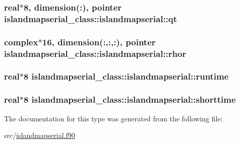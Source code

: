 \hypertarget{structislandmapserial__class_1_1islandmapserial_af02aedef0d1691e6628a5530c4417a9b}{
\subsubsection[{qt}]{\setlength{\rightskip}{0pt plus 5cm}real$\ast$8, dimension(\+:), pointer islandmapserial\+\_\+class\+::islandmapserial\+::qt\hspace{0.3cm}{\ttfamily [private]}}}\label{structislandmapserial__class_1_1islandmapserial_af02aedef0d1691e6628a5530c4417a9b}
\hypertarget{structislandmapserial__class_1_1islandmapserial_ad1b1997b9bd1ab97f872981ef86b4a8d}{
\subsubsection[{rhor}]{\setlength{\rightskip}{0pt plus 5cm}complex$\ast$16, dimension(\+:,\+:,\+:), pointer islandmapserial\+\_\+class\+::islandmapserial\+::rhor\hspace{0.3cm}{\ttfamily [private]}}}\label{structislandmapserial__class_1_1islandmapserial_ad1b1997b9bd1ab97f872981ef86b4a8d}
\hypertarget{structislandmapserial__class_1_1islandmapserial_a8a69633f0f6b8b8978369702e7135782}{
\subsubsection[{runtime}]{\setlength{\rightskip}{0pt plus 5cm}real$\ast$8 islandmapserial\+\_\+class\+::islandmapserial\+::runtime\hspace{0.3cm}{\ttfamily [private]}}}\label{structislandmapserial__class_1_1islandmapserial_a8a69633f0f6b8b8978369702e7135782}
\hypertarget{structislandmapserial__class_1_1islandmapserial_a2131d18b606e03ec9535bee28a66d8ed}{
\subsubsection[{shorttime}]{\setlength{\rightskip}{0pt plus 5cm}real$\ast$8 islandmapserial\+\_\+class\+::islandmapserial\+::shorttime\hspace{0.3cm}{\ttfamily [private]}}}\label{structislandmapserial__class_1_1islandmapserial_a2131d18b606e03ec9535bee28a66d8ed}


The documentation for this type was generated from the following file\+:\begin{DoxyCompactItemize}
\item 
src/\hyperlink{islandmapserial_8f90}{islandmapserial.\+f90}\end{DoxyCompactItemize}
